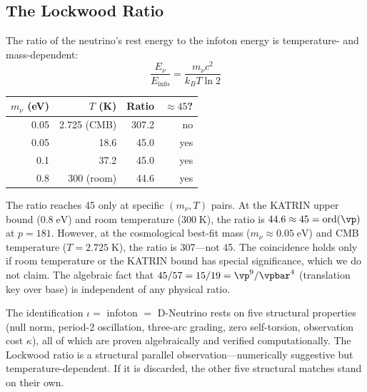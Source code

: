 \subsection{The Lockwood Ratio}

The ratio of the neutrino's rest energy to the infoton energy is temperature- and mass-dependent:
\[
\frac{E_\nu}{E_{\mathrm{info}}} = \frac{m_\nu c^2}{k_B T \ln 2}
\]

\begin{center}
\begin{tabular}{@{}rrrr@{}}
\toprule
$m_\nu$ (eV) & $T$ (K) & Ratio & $\approx 45$? \\
\midrule
0.05 & 2.725 (CMB) & 307.2 & no \\
0.05 & 18.6 & 45.0 & yes \\
0.1 & 37.2 & 45.0 & yes \\
0.8 & 300 (room) & 44.6 & yes \\
\bottomrule
\end{tabular}
\end{center}

The ratio reaches 45 only at specific $(m_\nu, T)$ pairs. At the KATRIN upper bound ($0.8\;\mathrm{eV}$) and room temperature ($300\;\mathrm{K}$), the ratio is $44.6 \approx 45 = \mathrm{ord}(\vp)$ at $p = 181$. However, at the cosmological best-fit mass ($m_\nu \approx 0.05\;\mathrm{eV}$) and CMB temperature ($T = 2.725\;\mathrm{K}$), the ratio is 307---not 45. The coincidence holds only if room temperature or the KATRIN bound has special significance, which we do not claim. The algebraic fact that $45/57 = 15/19 = \vp^9/\vpbar^4$ (translation key over base) is independent of any physical ratio.

\begin{remark}
The identification $\iota = $ infoton $=$ D-Neutrino rests on five structural properties (null norm, period-2 oscillation, three-arc grading, zero self-torsion, observation cost $\kappa$), all of which are proven algebraically and verified computationally. The Lockwood ratio is a structural parallel observation---numerically suggestive but temperature-dependent. If it is discarded, the other five structural matches stand on their own.
\end{remark}

